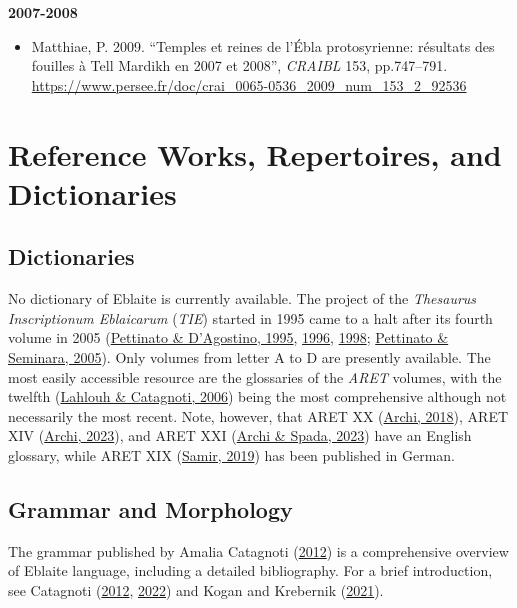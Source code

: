\documentclass[
]{book}
\providecommand{\tightlist}{%
  \setlength{\itemsep}{0pt}\setlength{\parskip}{0pt}}
\begin{document}
\textbf{2007-2008}

\begin{itemize}
\tightlist
\item
  Matthiae, P. 2009. ``Temples et reines de l'Ébla protosyrienne: résultats des fouilles à Tell Mardikh en 2007 et 2008'', \emph{CRAIBL} 153, pp.747--791. \url{https://www.persee.fr/doc/crai_0065-0536_2009_num_153_2_92536}
\end{itemize}

\hypertarget{reference-works-repertoires-and-dictionaries}{%
\section{Reference Works, Repertoires, and Dictionaries}\label{reference-works-repertoires-and-dictionaries}}

\hypertarget{dictionaries}{%
\subsection{Dictionaries}\label{dictionaries}}

No dictionary of Eblaite is currently available. The project of the \emph{Thesaurus Inscriptionum Eblaicarum} (\emph{TIE}) started in 1995 came to a halt after its fourth volume in 2005 (\protect\hyperlink{ref-PettinatoDAgostino1995}{Pettinato \& D'Agostino, 1995}, \protect\hyperlink{ref-PettinatoDAgostino1996}{1996}, \protect\hyperlink{ref-PettinatoDAgostino1998}{1998}; \protect\hyperlink{ref-PettinatoSeminara2005}{Pettinato \& Seminara, 2005}). Only volumes from letter A to D are presently available. The most easily accessible resource are the glossaries of the \emph{ARET} volumes, with the twelfth (\protect\hyperlink{ref-LahlouhCatagnoti2006}{Lahlouh \& Catagnoti, 2006}) being the most comprehensive although not necessarily the most recent. Note, however, that ARET XX (\protect\hyperlink{ref-Archi2018a}{Archi, 2018}), ARET XIV (\protect\hyperlink{ref-Archi2023}{Archi, 2023}), and ARET XXI (\protect\hyperlink{ref-ArchiSpada2023}{Archi \& Spada, 2023}) have an English glossary, while ARET XIX (\protect\hyperlink{ref-Samir2019}{Samir, 2019}) has been published in German.

\hypertarget{grammar-and-morphology}{%
\subsection{Grammar and Morphology}\label{grammar-and-morphology}}

The grammar published by Amalia Catagnoti (\protect\hyperlink{ref-Catagnoti2012a}{2012}) is a comprehensive overview of Eblaite language, including a detailed bibliography. For a brief introduction, see Catagnoti (\protect\hyperlink{ref-Catagnoti2012a}{2012}, \protect\hyperlink{ref-Catagnoti2022}{2022}) and Kogan and Krebernik (\protect\hyperlink{ref-KoganKrebernik2021b}{2021}).
\end{document}
